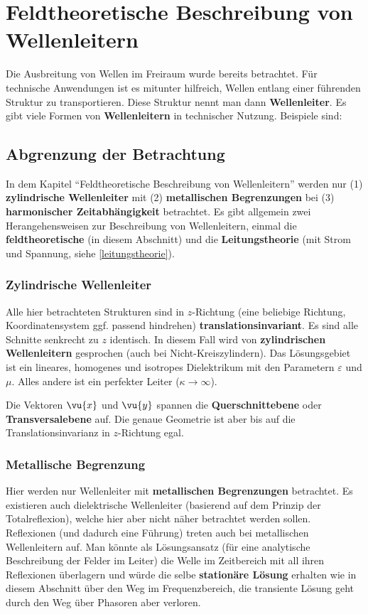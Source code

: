  \chapter{Feldtheoretische Beschreibung von Wellenleitern}
Die Ausbreitung von Wellen im Freiraum wurde bereits betrachtet. Für technische Anwendungen ist es mitunter hilfreich, Wellen entlang einer führenden Struktur zu transportieren. Diese Struktur nennt man dann \textbf{Wellenleiter}. Es gibt viele Formen von \textbf{Wellenleitern} in technischer Nutzung. Beispiele sind:
	\begin{center}
		\resizebox{\textwidth}{!}{}
	\end{center}
	\section{Abgrenzung der Betrachtung}
	In dem Kapitel \enquote{Feldtheoretische Beschreibung von Wellenleitern} werden nur (1) \textbf{zylindrische Wellenleiter} mit (2) \textbf{metallischen Begrenzungen} bei (3) \textbf{harmonischer Zeitabhängigkeit} betrachtet. Es gibt allgemein zwei Herangehensweisen zur Beschreibung von Wellenleitern, einmal die \textbf{feldtheoretische} (in diesem Abschnitt) und die \textbf{Leitungstheorie} (mit Strom und Spannung, siehe \ref{leitungstheorie}).
	\subsection{Zylindrische Wellenleiter}
	 Alle hier betrachteten Strukturen sind in $z$-Richtung (eine beliebige Richtung, Koordinatensystem ggf. passend hindrehen) \textbf{translationsinvariant}. Es sind alle Schnitte senkrecht zu $z$ identisch. In diesem Fall wird von \textbf{zylindrischen Wellenleitern} gesprochen (auch bei Nicht-Kreiszylindern). Das Lösungsgebiet ist ein lineares, homogenes und isotropes Dielektrikum mit den Parametern \(\varepsilon\) und \(\mu\). Alles andere ist ein perfekter Leiter (\(\kappa \to \infty\)). 
	 \begin{center}
	 	
	 \end{center}
	 Die Vektoren \(\vu{x}\) und \(\vu{y}\) spannen die \textbf{Querschnittebene} oder \textbf{Transversalebene} auf. Die genaue Geometrie ist aber bis auf die Translationsinvarianz in $z$-Richtung egal.    
	 \subsection{Metallische Begrenzung}
	 Hier werden nur Wellenleiter mit \textbf{metallischen Begrenzungen} betrachtet. Es existieren auch dielektrische Wellenleiter (basierend auf dem Prinzip der Totalreflexion), welche hier aber nicht näher betrachtet werden sollen. Reflexionen (und dadurch eine Führung) treten auch bei metallischen Wellenleitern auf. Man könnte als Lösungsansatz (für eine analytische Beschreibung der Felder im Leiter) die Welle im Zeitbereich mit all ihren Reflexionen überlagern und würde die selbe \textbf{stationäre Lösung} erhalten wie in diesem Abschnitt über den Weg im Frequenzbereich, die transiente Lösung geht durch den Weg über Phasoren aber verloren.
